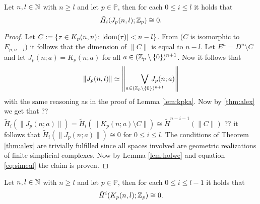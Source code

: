 \begin{lemma}\label{lem:jc0}
  Let $n,l \in \mathbb{N}$ with $n \geq l$ and let $p \in \mathbb{P}$, then for each $0 \leq i \leq l$ it holds that
  \begin{equation*}
    \tilde{H}_i(J_p(n,l); \mathbb{Z}_p) \cong 0.
  \end{equation*}
\end{lemma}

\begin{proof}
  Let $C := \{\tau \in K_p(n,n)\colon |{\rm dom}(\tau)| < n - l\}$. From \cite[p. 2513, Remark]{mc2002} ($C$ is isomorphic to $E_{p,n-l}$) it follows that the dimension of $\lVert C \rVert$ is equal to $n-l$.
  Let $E^n = D^n\setminus C$ and let $J_p(n;a) = K_p(n;a)$ for all $a \in (\mathbb{Z}_p\setminus \{0\})^{n+1}$. Now it follows that
  \begin{equation}\label{eq:simeql}
    \lVert J_p(n,l) \rVert \simeq \left\lVert \bigvee\limits_{a \in (\Z_p \setminus \{0\})^{n+1}} \hspace*{-20px}J_p(n;a) \right\rVert
  \end{equation}
  with the same reasoning as in the proof of Lemma \ref{lem:kpka}.
  Now by \ref{thm:alex} we get that ?? $\tilde{H}_i(\lVert J_p(n;a) \rVert) = \tilde{H}_i(\rVert K_p(n;a)\setminus C \rVert) \cong \tilde{H}^{n-i-1}(\lVert C\rVert)$ ?? it follows that $\tilde{H}_i(\lVert J_p(n;a) \rVert) \cong 0$ for $0 \leq i \leq l$. The conditions of Theorem \ref{thm:alex} are trivially fulfilled since all spaces involved are geometric realizations of finite simplicial complexes. Now by Lemma \ref{lem:holwe} and equation \ref{eq:simeql} the claim is proven. 
\end{proof}

\begin{lemma}\label{lem:knp}
  Let $n, l \in \mathbb{N}$ with $n \geq l$ and let $p \in \mathbb{P}$, then for each $0 \leq i \leq l-1$ it holds that
  \begin{equation*}
    \tilde{H}^i(K_p(n,l); \mathbb{Z}_p) \cong 0.
  \end{equation*}
\end{lemma}

